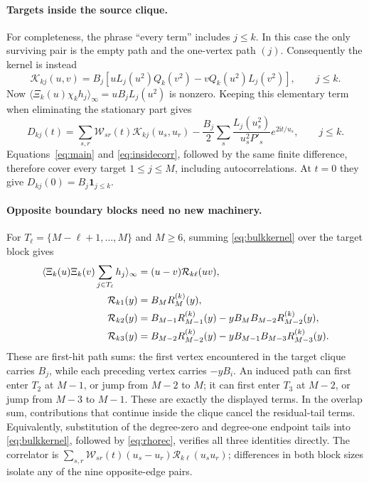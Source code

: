 \documentclass[11pt,a4paper]{article}
\newcommand{\ii}{\mathrm i}
\newcommand{\av}[1]{\langle #1\rangle_\infty}
\newcommand{\Kern}{\mathcal K}
\newcommand{\W}{\mathcal W}
\begin{document}
\paragraph{Targets inside the source clique.}
For completeness, the phrase ``every term'' includes $j\le k$. In this case the only surviving pair is the empty path and the one-vertex path $(j)$. Consequently the kernel is instead
\begin{equation}
 \Kern_{kj}(u,v)=B_j\left[uL_j(u^2)Q_k(v^2)-vQ_k(u^2)L_j(v^2)\right],\qquad j\le k.
 \label{eq:insidekernel}
\end{equation}
Now $\av{\Xi_k(u)\chi_kh_j}=uB_jL_j(u^2)$ is nonzero. Keeping this elementary term when eliminating the stationary part gives
\begin{equation}
 D_{kj}(t)=\sum_{s,r}\W_{sr}(t)\Kern_{kj}(u_s,u_r)
 -\frac{B_j}{2}\sum_s\frac{L_j(u_s^2)}{u_s^2P'_s}e^{2\ii t/u_s},\qquad j\le k.
 \label{eq:insidecorr}
\end{equation}
Equations~\eqref{eq:main} and \eqref{eq:insidecorr}, followed by the same finite difference, therefore cover every target $1\le j\le M$, including autocorrelations. At $t=0$ they give $D_{kj}(0)=B_j\mathbf1_{j\le k}$.

\paragraph{Opposite boundary blocks need no new machinery.}
For $T_\ell=\{M-\ell+1,\ldots,M\}$ and $M\ge6$, summing \eqref{eq:bulkkernel} over the target block gives
\begin{align}
 \av{\Xi_k(u)\Xi_k(v)\sum_{j\in T_\ell}h_j}
 &=(u-v)\mathcal R_{k\ell}(uv),\notag\\
 \mathcal R_{k1}(y)&=B_MR_M^{(k)}(y),\notag\\
 \mathcal R_{k2}(y)&=B_{M-1}R_{M-1}^{(k)}(y)-yB_MB_{M-2}R_{M-2}^{(k)}(y),\notag\\
 \mathcal R_{k3}(y)&=B_{M-2}R_{M-2}^{(k)}(y)-yB_{M-1}B_{M-3}R_{M-3}^{(k)}(y).
 \label{eq:firsthit}
\end{align}
These are first-hit path sums: the first vertex encountered in the target clique carries $B_j$, while each preceding vertex carries $-yB_i$. An induced path can first enter $T_2$ at $M-1$, or jump from $M-2$ to $M$; it can first enter $T_3$ at $M-2$, or jump from $M-3$ to $M-1$. These are exactly the displayed terms. In the overlap sum, contributions that continue inside the clique cancel the residual-tail terms. Equivalently, substitution of the degree-zero and degree-one endpoint tails into \eqref{eq:bulkkernel}, followed by \eqref{eq:rhorec}, verifies all three identities directly. The correlator is $\sum_{s,r}\W_{sr}(t)(u_s-u_r)\mathcal R_{k\ell}(u_su_r)$; differences in both block sizes isolate any of the nine opposite-edge pairs.
\end{document}
